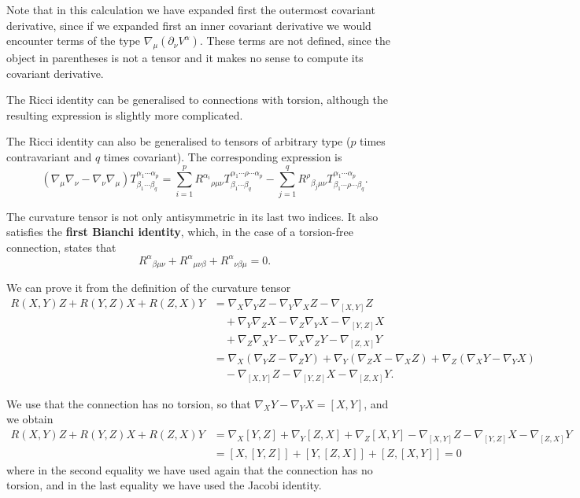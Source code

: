 \begin{points}
\item Note that in this calculation we have expanded first the outermost covariant derivative, since if we expanded first an inner covariant derivative we would encounter terms of the type $\nabla_\mu(\partial_\nu V^\alpha)$. These terms are not defined, since the object in parentheses is not a tensor and it makes no sense to compute its covariant derivative.

\item The Ricci identity can be generalised to connections with torsion, although the resulting expression is slightly more complicated.

\item The Ricci identity can also be generalised to tensors of arbitrary type ($p$ times contravariant and $q$ times covariant). The corresponding expression is
\[
  \left(\nabla_\mu\nabla_\nu-\nabla_\nu\nabla_\mu\right)T^{\alpha_1\cdots\alpha_p}_{\beta_1\cdots\beta_q}=\sum_{i=1}^pR^{\alpha_i}{}_{\rho\mu\nu}T^{\alpha_1\cdots\rho\cdots\alpha_p}_{\beta_1\cdots\beta_q}-\sum_{j=1}^qR^\rho{}_{\beta_j\mu\nu}T^{\alpha_1\cdots\alpha_p}_{\beta_1\cdots\rho\cdots\beta_q} .
\]

\item The curvature tensor is not only antisymmetric in its last two indices. It also satisfies the \textbf{first Bianchi identity}, which, in the case of a torsion-free connection, states that
\[
  R^\alpha{}_{\beta\mu\nu}+R^\alpha{}_{\mu\nu\beta}+R^\alpha{}_{\nu\beta\mu}=0 .
\]

\item We can prove it from the definition of the curvature tensor
\begin{align*}
  R(X,Y)Z+R(Y,Z)X+R(Z,X)Y&=\nabla_X\nabla_YZ-\nabla_Y\nabla_XZ-\nabla_{[X,Y]}Z\\
  &\quad+\nabla_Y\nabla_ZX-\nabla_Z\nabla_YX-\nabla_{[Y,Z]}X\\
  &\quad+\nabla_Z\nabla_XY-\nabla_X\nabla_ZY-\nabla_{[Z,X]}Y\\
  &=\nabla_X\left(\nabla_YZ-\nabla_ZY\right)+\nabla_Y\left(\nabla_ZX-\nabla_XZ\right)+\nabla_Z\left(\nabla_XY-\nabla_YX\right)\\
  &\quad-\nabla_{[X,Y]}Z-\nabla_{[Y,Z]}X-\nabla_{[Z,X]}Y.
\end{align*}

\item We use that the connection has no torsion, so that $\nabla_XY-\nabla_YX=[X,Y]$, and we obtain
\begin{align*}
  R(X,Y)Z+R(Y,Z)X+R(Z,X)Y&=\nabla_X[Y,Z]+\nabla_Y[Z,X]+\nabla_Z[X,Y]-\nabla_{[X,Y]}Z-\nabla_{[Y,Z]}X-\nabla_{[Z,X]}Y\\
  &=[X,[Y,Z]]+[Y,[Z,X]]+[Z,[X,Y]]=0
\end{align*}
where in the second equality we have used again that the connection has no torsion, and in the last equality we have used the Jacobi identity.


\end{points}
